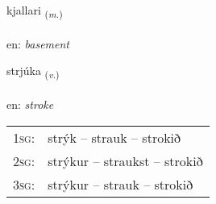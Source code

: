 \documentclass[frontgrid, backgrid]{flacards}\usepackage[]{graphicx}\usepackage[]{xcolor}
\begin{document}
\renewcommand{\blhead}{\vskip5pt {\small\bfseries\footnotesize Nafnorð | Noun }}
\renewcommand{\bcfoot}{\vskip5pt \hspace{2pt}{\small\bfseries\footnotesize 3K}}


{kjallari \small{\textsubscript{(\textit{m.})}} \\[1ex] %
\textphonetic{[cʰatlarɪ]} \\
en: \emph{basement} \\  [2ex]
\renewcommand*{\arraystretch}{0.8}
}

\renewcommand{\flhead}{\vskip5pt \fboxsep=0pt {\small\bfseries\footnotesize Sagnorð | Verb}}
\renewcommand{\fcfoot}{\vskip5pt \fboxsep=0pt \hspace{2pt}{\small\bfseries\footnotesize 3K}}

\renewcommand{\blhead}{\vskip5pt {\small\bfseries\footnotesize Sagnorð | Verb }}
\renewcommand{\bcfoot}{\vskip5pt \hspace{2pt}{\small\bfseries\footnotesize 3K}}


{strjúka \small{\textsubscript{(\textit{v.})}} \\[1ex] %
\textphonetic{[strjuːka]} \\
en: \emph{stroke} \\  [2ex]
\renewcommand*{\arraystretch}{0.8}
\begin{tabular}{p{1cm}l}
\textsc{1sg}: & strýk -- strauk -- strokið \\ 
\textsc{2sg}: & strýkur -- straukst -- strokið \\ 
\textsc{3sg}: & strýkur -- strauk -- strokið \\ 
\end{tabular}
}

\renewcommand{\flhead}{\vskip5pt \fboxsep=0pt {\small\bfseries\footnotesize Nafnorð | Noun}}
\renewcommand{\fcfoot}{\vskip5pt \fboxsep=0pt \hspace{2pt}{\small\bfseries\footnotesize 3K}}
\end{document}
